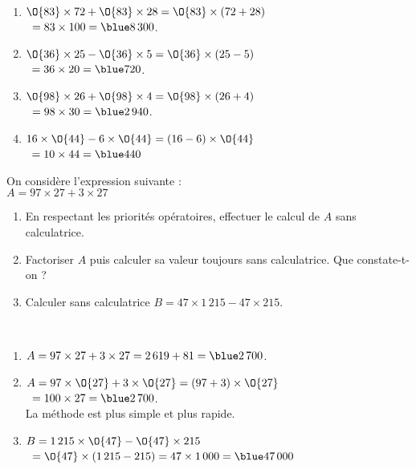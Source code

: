 \begin{colonne*exercice}
\begin{corrige}
   \ \\ [-5mm]
   \begin{enumerate}
      \item $\O{83}\times72+\O{83} \times28 =\O{83}\times(72+28)$ \\
         \quad\, $=83\times100 =\blue 8\,300$.
      \item $\O{36}\times25-\O{36}\times5 =\O{36}\times(25-5)$ \\
         \quad\, $=36\times20 =\blue 720$.
      \item $\O{98}\times26+\O{98}\times4 =\O{98}\times(26+4)$ \\
         \quad\, $=98\times30 =\blue 2\,940$.
      \item $16\times\O{44}-6\times\O{44} =(16-6)\times\O{44}$ \\
         \quad\, $=10\times44 =\blue 440$
   \end{enumerate}
\end{corrige}

\bigskip


\begin{exercice} %
   On considère l'expression suivante : \\
   $A=97\times27+3\times27$
   \begin{enumerate}
      \item En respectant les priorités opératoires, effectuer le calcul de $A$ sans calculatrice.
      \item Factoriser $A$ puis calculer sa valeur toujours sans calculatrice. Que constate-t-on ?
      \item Calculer sans calculatrice $B =47\times1\,215-47\times215$.
   \end{enumerate}
\end{exercice}  

\begin{corrige}
   \ \\ [-5mm]
   \begin{enumerate}
      \item $A=97\times27+3\times27 =2\,619+81 =\blue2\,700$.
      \item $A=97\times\O{27}+3\times\O{27} =(97+3)\times\O{27}$ \\
         \quad\, $=100\times27 =\blue2\,700$. \\
         {\blue La méthode  est plus simple et plus rapide}. 
      \item $B =1\,215\times\O{47}-\O{47}\times215$ \\
         \quad\, $=\O{47}\times(1\,215-215) =47\times1\,000 =\blue 47\,000$
   \end{enumerate}
\end{corrige}  


\end{colonne*exercice}
